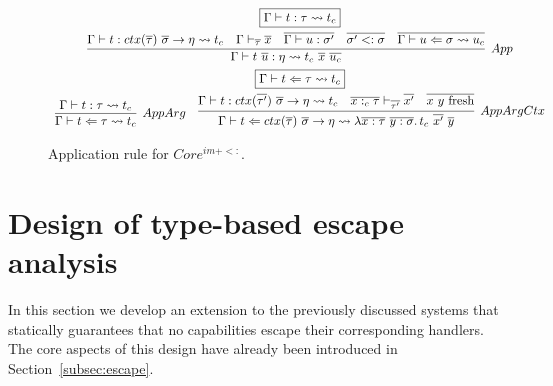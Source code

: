 \documentclass[acmsmall,review,screen]{acmart}
\newcommand{\mathframebox}[1]{\framebox{$\displaystyle #1$}}
\newcommand{\ap}{~}
\newcommand{\step}{\rightsquigarrow}
\begin{document}
\begin{figure}
    \begin{gather*}
        \mathframebox{\Gamma\vdash t : \tau \step t_c} \\
        \infer[App]{
            \Gamma\vdash t\ap\overline{u} : \eta \step t_c \ap \overline{x} \ap \overline{u_c}
        }{
            \Gamma\vdash t : ctx(\overline{\tau})~\overline{\sigma}\to \eta \step t_c
            &
            \Gamma \vdash_{\overline{\tau}} \overline{x}
            &
            \overline{\Gamma\vdash u : \sigma'}
            &
            \overline{\sigma' <: \sigma}
            &
            \overline{\Gamma\vdash u \Leftarrow \sigma \step u_c}
        } \\
        \mathframebox{\Gamma\vdash t \Leftarrow \tau \step t_c} \\
        \begin{array}{cc}
            \infer[AppArg]{
                \Gamma\vdash t \Leftarrow \tau \step t_c
            }{
                \Gamma\vdash t : \tau \step t_c
            }
            &
            \infer[AppArgCtx]{
                \Gamma \vdash t \Leftarrow ctx(\overline{\tau}) ~\overline{\sigma}\to\eta\step \lambda \overline{x : \tau}~\overline{y : \sigma}\ldotp t_c\ap \overline{x'}\ap\overline{y}
            }{
                \Gamma \vdash t : ctx(\overline{\tau'}) ~\overline{\sigma}\to\eta \step t_c
                &
                \overline{x :_c \tau} \vdash_{\overline{\tau'}} \overline{x'}
                &
                \overline{x~y \text{ fresh}}
            }
        \end{array}
    \end{gather*}
    \caption{Application rule for $Core^{im + <:}$.}
    \label{sig:fim-sub-app}
\end{figure}





\section{Design of type-based escape analysis} \label{sec:escape}

In this section we develop an extension to the previously discussed systems that statically guarantees that no capabilities escape their corresponding handlers.
The core aspects of this design have already been introduced in Section~\ref{subsec:escape}.
\end{document}
